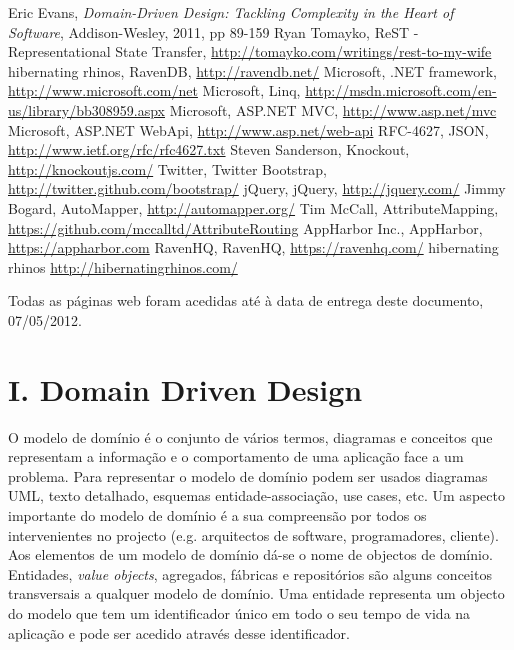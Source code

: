 \documentclass[]{article}
\begin{document}
\begin{thebibliography}{9}
 Eric Evans, \emph{Domain-Driven Design: Tackling Complexity in the Heart of Software},  Addison-Wesley, 2011, pp 89-159
 Ryan Tomayko, ReST - Representational State Transfer,
\url{http://tomayko.com/writings/rest-to-my-wife}
 hibernating rhinos, RavenDB,
\url{http://ravendb.net/}
 Microsoft, .NET framework,
\url{http://www.microsoft.com/net}
 Microsoft, Linq,
\url{http://msdn.microsoft.com/en-us/library/bb308959.aspx}
 Microsoft, ASP.NET MVC,
\url{http://www.asp.net/mvc}
 Microsoft, ASP.NET WebApi,
\url{http://www.asp.net/web-api}
 RFC-4627, JSON,
\url{http://www.ietf.org/rfc/rfc4627.txt}
 Steven Sanderson, Knockout,
\url{http://knockoutjs.com/}
 Twitter, Twitter Bootstrap,
\url{http://twitter.github.com/bootstrap/}
 jQuery, jQuery,
\url{http://jquery.com/}
 Jimmy Bogard, AutoMapper,
\url{http://automapper.org/}
 Tim McCall, AttributeMapping,
\url{https://github.com/mccalltd/AttributeRouting}
 AppHarbor Inc., AppHarbor,
\url{https://appharbor.com}
 RavenHQ, RavenHQ,
\url{https://ravenhq.com/}
 hibernating rhinos
\url{http://hibernatingrhinos.com/}
\end{thebibliography}
Todas as páginas web foram acedidas até à data de entrega deste documento, 07/05/2012.
\newpage

\section{I. Domain Driven Design}
\label{anexoa}
O modelo de domínio é o conjunto de vários termos, diagramas e conceitos que representam a informação e o comportamento de uma aplicação face a um problema. Para representar o modelo de domínio podem ser usados diagramas UML, texto detalhado, esquemas entidade-associação, use cases, etc. Um aspecto importante do modelo de domínio é a sua compreensão por todos os intervenientes no projecto (e.g. arquitectos de software, programadores, cliente). Aos elementos de um modelo de domínio dá-se o nome de objectos de domínio.\\

Entidades, \emph{value objects}, agregados, fábricas e repositórios são alguns conceitos transversais a qualquer modelo de domínio. Uma entidade representa um objecto do modelo que tem um identificador único em todo o seu tempo de vida na aplicação e pode ser acedido através desse identificador.\\
\end{document}
